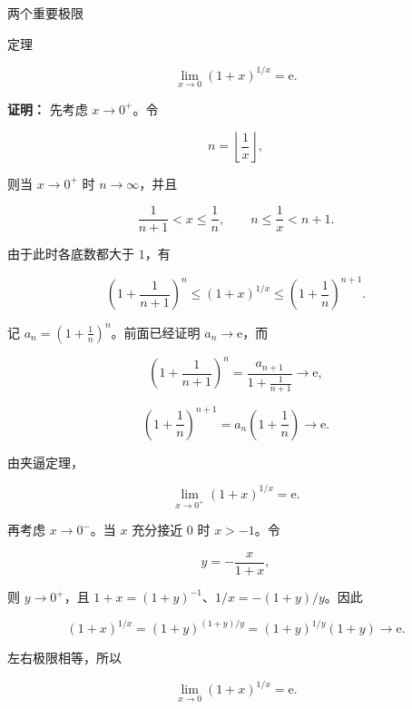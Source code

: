 \documentclass[aspectratio=169,10pt,fontset=fandol]{ctexbeamer}
\newcommand{\ee}{\mathrm{e}}
\begin{document}
\begin{frame}[t,fragile]{两个重要极限}
\normalsize
\begin{block}{定理}
{\normalsize


\[

\lim_{x\to0}(1+x)^{1/x}=\ee.

\]


}
\end{block}
\pause
{\normalsize
\textbf{证明：}
先考虑 \(x\to0^+\)。令

\[

n=\left\lfloor\frac1x\right\rfloor,

\]

则当 \(x\to0^+\) 时 \(n\to\infty\)，并且

\[

\frac1{n+1}<x\leq\frac1n,\qquad n\leq\frac1x<n+1.

\]

由于此时各底数都大于 \(1\)，有

\[

\left(1+\frac1{n+1}\right)^n

\leq(1+x)^{1/x}

\leq\left(1+\frac1n\right)^{n+1}.

\]

记 \(a_n=(1+\frac1n)^n\)。前面已经证明 \(a_n\to\ee\)，而

\[

\left(1+\frac1{n+1}\right)^n

=\frac{a_{n+1}}{1+\frac1{n+1}}\to\ee,

\]

\[

\left(1+\frac1n\right)^{n+1}

=a_n\left(1+\frac1n\right)\to\ee.

\]

由夹逼定理，

\[

\lim_{x\to0^+}(1+x)^{1/x}=\ee.

\]



再考虑 \(x\to0^-\)。当 \(x\) 充分接近 \(0\) 时 \(x>-1\)。令

\[

y=-\frac{x}{1+x},

\]

则 \(y\to0^+\)，且 \(1+x=(1+y)^{-1}\)、\(1/x=-(1+y)/y\)。因此

\[

(1+x)^{1/x}

=(1+y)^{(1+y)/y}

=(1+y)^{1/y}(1+y)\to\ee.

\]

左右极限相等，所以

\[

\lim_{x\to0}(1+x)^{1/x}=\ee.

\]


}
\end{frame}
\end{document}

